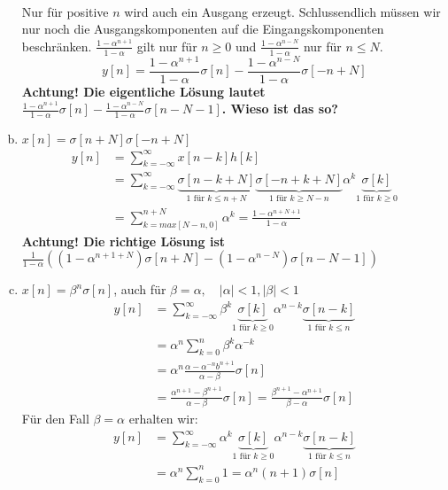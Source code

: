 \begin{enumerate}[a)]
\begin{align*}
			\end{align*}
			Nur für positive $n$ wird auch ein Ausgang erzeugt. Schlussendlich müssen wir nur noch die  Ausgangskomponenten auf die Eingangskomponenten beschränken. $\frac{1-\alpha ^{n+1}}{1-\alpha} $ gilt nur für $n\ge 0$ und $\frac{1-\alpha^{n-N}}{1-\alpha}$ nur für $n\le N$.
			\[
				y[n]	= \frac{1-\alpha ^{n+1}}{1-\alpha}\sigma[n]-\frac{1-\alpha^{n-N}}{1-\alpha}\sigma[-n+N]
			\]
			\textbf{Achtung! Die eigentliche Lösung lautet $\frac{1-\alpha ^{n+1}}{1-\alpha}\sigma[n]-\frac{1-\alpha^{n-N}}{1-\alpha}\sigma[n-N-1]$. Wieso ist das so?}
		\item $x[n]=\sigma [n+N]\sigma [-n+N]$
			\begin{align*}
				y[n]	&= \sum_{k=-\infty}^{\infty}x[n-k]h[k] \\
						&= \sum_{k=-\infty}^{\infty}\underbrace{\sigma[n-k+N]}_{1 \text{ für } k\le n+N}\underbrace{\sigma[-n+k+N]}_{1 \text{ für } k\ge N-n} \alpha^{k}\underbrace{\sigma[k]}_{1 \text{ für } k\ge 0} \\
						&= \sum_{k=max[N-n, 0]}^{n+N} \alpha^{k} = \frac{1-\alpha^{n+N+1}}{1-\alpha}
			\end{align*}
			\textbf{Achtung! Die richtige Lösung ist\\ $\frac{1}{1-\alpha}((1-\alpha^{n+1+N})\sigma[n+N]-(1-\alpha^{n-N})\sigma[n-N-1])$}
		\item $x[n]=\beta ^n \sigma [n]$, auch für $\beta = \alpha, \quad |\alpha|<1, |\beta| < 1$
			\begin{align*}
				y[n]	&= \sum_{k=-\infty}^{\infty} \beta^k \underbrace{\sigma[k]}_{1 \text{ für } k\ge 0}\alpha^{n-k} \underbrace{\sigma[n-k]}_{1 \text{ für } k \le n} \\
						&= \alpha^n \sum_{k=0}^{n} \beta^k \alpha^{-k} \\
						&= \alpha^n \frac{\alpha-\alpha^{-n}b^{n+1}}{\alpha-\beta}\sigma[n] \\
						&= \frac{\alpha^{n+1}-\beta^{n+1}}{\alpha-\beta}\sigma[n] = \frac{\beta^{n+1}-\alpha^{n+1}}{\beta-\alpha}\sigma[n]
			\end{align*}
			Für den Fall $\beta = \alpha$ erhalten wir:
			\begin{align*}
				y[n]	&=  \sum_{k=-\infty}^{\infty} \alpha^k \underbrace{\sigma[k]}_{1 \text{ für } k\ge 0}\alpha^{n-k} \underbrace{\sigma[n-k]}_{1 \text{ für } k \le n} \\
						&= \alpha^n \sum_{k=0}^{n}1 = \alpha^n (n+1) \sigma[n]
			\end{align*}
	\end{enumerate}